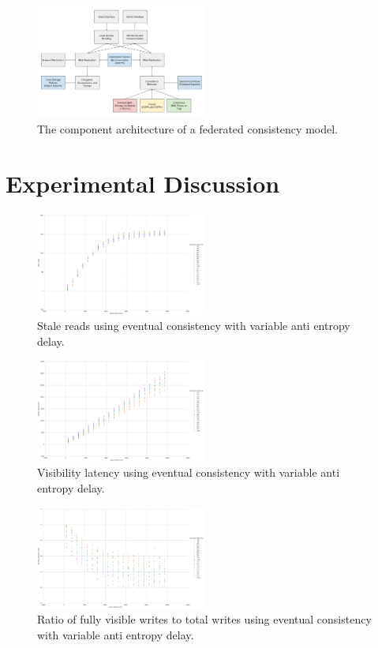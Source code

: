\documentclass[letterpaper,twocolumn,10pt]{article}
\begin{document}
\begin{figure}[h]
    \centering
    \includegraphics[width=0.5\textwidth]{figures/architecture}
    \caption{The component architecture of a federated consistency model.}
\end{figure}

\section{Experimental Discussion}

\begin{figure}[h]
    \centering
    \includegraphics[width=0.5\textwidth]{figures/ae_stale_reads}
    \caption{Stale reads using eventual consistency with variable anti entropy delay.}
\end{figure}

\begin{figure}[h]
    \centering
    \includegraphics[width=0.5\textwidth]{figures/ae_viz_latency}
    \caption{Visibility latency using eventual consistency with variable anti entropy delay.}
\end{figure}

\begin{figure}[h]
    \centering
    \includegraphics[width=0.5\textwidth]{figures/ae_viz_ratio}
    \caption{Ratio of fully visible writes to total writes using eventual consistency with variable anti entropy delay.}
\end{figure}
\end{document}
